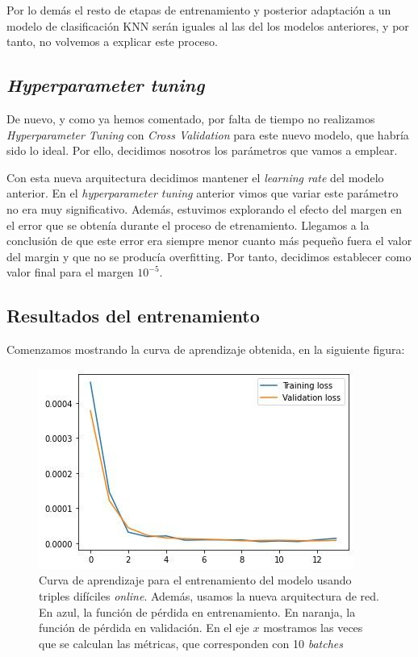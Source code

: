 \documentclass[11pt]{article}
\begin{document}
Por lo demás el resto de etapas de entrenamiento y posterior adaptación a un modelo de clasificación KNN serán iguales al las del los modelos anteriores, y por tanto, no volvemos a explicar este proceso. 

\subsection{\emph{Hyperparameter tuning}} 

De nuevo, y como ya hemos comentado, por falta de tiempo no realizamos \emph{Hyperparameter Tuning} con \emph{Cross Validation} para este nuevo modelo, que habría sido lo ideal. Por ello, decidimos nosotros los parámetros que vamos a emplear.

Con esta nueva arquitectura decidimos mantener el \emph{learning rate} del modelo anterior. En el \emph{hyperparameter tuning} anterior vimos que variar este parámetro no era muy significativo. Además, estuvimos explorando el efecto del margen en el error que se obtenía durante el proceso de etrenamiento. Llegamos a la conclusión de que este error era siempre menor cuanto más pequeño fuera el valor del margin y que no se producía overfitting. Por tanto, decidimos establecer como valor final para el margen $10^{-5}$. 

\subsection{Resultados del entrenamiento}

Comenzamos mostrando la curva de aprendizaje obtenida, en la siguiente figura:

\begin{figure}[H]
    \centering
    \includegraphics[width = 0.5 \textwidth]{triples_light_curva_aprendizje}
    \caption{Curva de aprendizaje para el entrenamiento del modelo usando triples difíciles \emph{online}. Además, usamos la nueva arquitectura de red. En azul, la función de pérdida en entrenamiento. En naranja, la función de pérdida en validación. En el eje $x$ mostramos las veces que se calculan las métricas, que corresponden con 10 \emph{batches}}
\end{figure}
\end{document}
